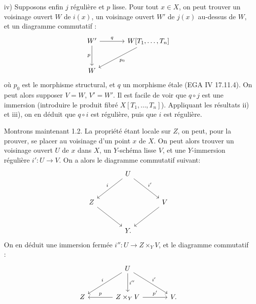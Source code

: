 iv)
Supposons enfin $j$ régulière et $p$ lisse. Pour tout $x\in X$, on peut trouver un voisinage ouvert $W$ de $i(x)$, un voisinage ouvert $W'$ de $j(x)$ au-dessus de $W$, et un diagramme commutatif :
\[
\begin{tikzcd}[column sep=large,row sep=large]
W' \arrow[r,"q"] \arrow[d,"p"'] & W[T_1,\ldots,T_n] \arrow[dl,"p_0"]\\
W &
\end{tikzcd}
\]
où $p_0$ est le morphisme structural, et $q$ un morphisme étale (EGA IV 17.11.4). On peut alors supposer $V=W$, $V'=W'$. Il est facile de voir que $q\circ j$ est une immersion (introduire le produit fibré $X[T_1,\ldots,T_n]$). Appliquant les résultats ii) et iii), on en déduit que $q\circ i$ est régulière, puis que $i$ est régulière.

Montrons maintenant 1.2. La propriété étant locale sur $Z$, on peut, pour la prouver, se placer au voisinage d'un point $x$ de $X$. On peut alors trouver un voisinage ouvert $U$ de $x$ dans $X$, un $Y$-schéma lisse $V$, et une $Y$-immersion régulière $i':U\to V$. On a alors le diagramme commutatif suivant:
\[
\begin{tikzcd}[column sep=large,row sep=large]
& U \arrow[dl,"i"'] \arrow[dr,"i'"] &\\
Z \arrow[dr] && V \arrow[dl]\\
& Y . &
\end{tikzcd}
\]
On en déduit une immersion fermée $i'':U\to Z\times_Y V$, et le diagramme commutatif :
\[
\begin{tikzcd}[column sep=large,row sep=large]
& U \arrow[dl,"i"'] \arrow[d,"i''"] \arrow[dr,"i'"] &\\
Z & Z\times_Y V \arrow[l,"p"'] \arrow[r,"p'"] & V.
\end{tikzcd}
\]
